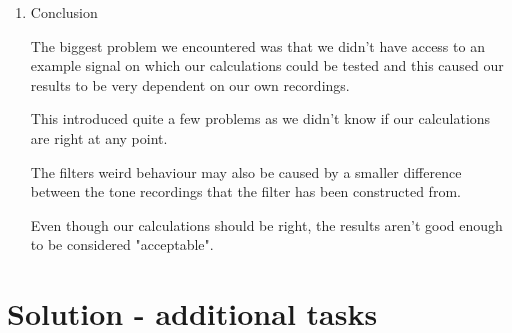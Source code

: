 \documentclass[a4paper, 11pt]{article}
\begin{document}
\begin{enumerate}
        \item
        Conclusion

        The biggest problem we encountered was that we didn't have access to an example signal
        on which our calculations could be tested and this caused our results to be very dependent
        on our own recordings.

        This introduced quite a few problems
        as we didn't know if our calculations are right at any point.

        The filters weird behaviour may also be caused by a smaller difference between the tone recordings
        that the filter has been constructed from.

        Even though our calculations should be right, the results aren't good enough to be considered "acceptable".

    \end{enumerate}

    \newpage
    \section*{Solution - additional tasks}
\end{document}
